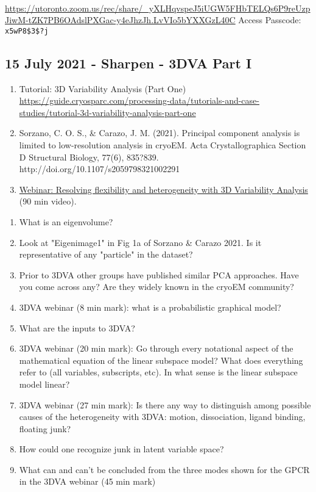 \documentclass[11pt, oneside]{article}   	%
\begin{document}
 \\
{\tiny \url{https://utoronto.zoom.us/rec/share/_yXLHqvspeJ5iUGW5FHbTELQs6P9reUzpJiwM-tZK7PB6OAdslPXGac-y4eJhzJh.LvVIo5bYXXGzL40C}}
Access Passcode: \texttt{x5wP8\$3\$?j}

\subsection{15 July 2021 - Sharpen - 3DVA Part I}
\begin{enumerate}
	\item Tutorial: 3D Variability Analysis (Part One) \url{https://guide.cryosparc.com/processing-data/tutorials-and-case-studies/tutorial-3d-variability-analysis-part-one}
	\item Sorzano, C. O. S., \& Carazo, J. M. (2021). Principal component analysis is limited to low-resolution analysis in cryoEM. Acta Crystallographica Section D Structural Biology, 77(6), 835?839. http://doi.org/10.1107/s2059798321002291
	\item \href{https://youtu.be/0O781Od1z_E}{Webinar: Resolving flexibility and heterogeneity with 3D Variability Analysis} (90 min video).
\end{enumerate}
\begin{enumerate}
	\item What is an eigenvolume?
	\item Look at "Eigenimage1" in Fig 1a of Sorzano \& Carazo 2021. Is it representative of any "particle" in the dataset?
	\item Prior to 3DVA other groups have published similar PCA approaches. Have you come across any? Are they widely known in the cryoEM community? 
	\item 3DVA webinar (8 min mark): what is a probabilistic graphical model?
	\item What are the inputs to 3DVA? 
	\item 3DVA webinar (20 min mark): Go through every notational aspect of the mathematical equation of the linear subspace model? What does everything refer to (all variables, subscripts, etc). In what sense is the linear subspace model linear?
	\item 3DVA webinar (27 min mark): Is there any way to distinguish among possible causes of the heterogeneity with 3DVA: motion, dissociation, ligand binding, floating junk?
	\item How could one recognize junk in latent variable space?
	\item What can and can't be concluded from the three modes shown for the GPCR in the 3DVA webinar (45 min mark)
\end{enumerate}
\end{document}
